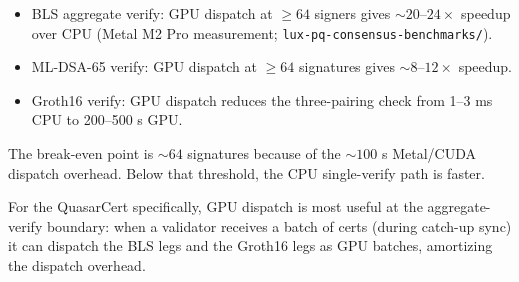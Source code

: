 \begin{itemize}[leftmargin=2em,nosep]
\item BLS aggregate verify: GPU dispatch at $\geq 64$ signers
      gives $\sim 20$--$24\times$ speedup over CPU (Metal M2 Pro
      measurement; \texttt{lux-pq-consensus-benchmarks/}).
\item ML-DSA-65 verify: GPU dispatch at $\geq 64$ signatures
      gives $\sim 8$--$12\times$ speedup.
\item Groth16 verify: GPU dispatch reduces the three-pairing check
      from 1--3 ms CPU to 200--500 \textmu s GPU.
\end{itemize}

The break-even point is $\sim 64$ signatures because of the
$\sim 100$ \textmu s Metal/CUDA dispatch overhead. Below that
threshold, the CPU single-verify path is faster.

For the QuasarCert specifically, GPU dispatch is most useful at
the aggregate-verify boundary: when a validator receives a batch
of certs (during catch-up sync) it can dispatch the BLS legs and
the Groth16 legs as GPU batches, amortizing the dispatch overhead.
